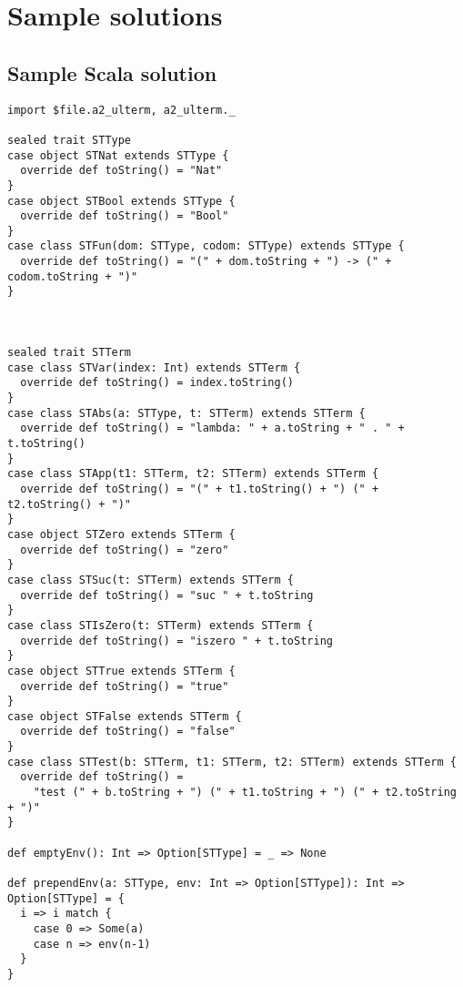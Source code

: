 \documentclass[11pt]{article}
\theoremstyle{definition}
\begin{document}
\section*{Sample solutions}
\label{sec:org2ff2d7b}

\subsection*{Sample Scala solution}
\label{sec:org60900f0}

\begin{verbatim}
import $file.a2_ulterm, a2_ulterm._

sealed trait STType
case object STNat extends STType {
  override def toString() = "Nat"
}
case object STBool extends STType {
  override def toString() = "Bool"
}
case class STFun(dom: STType, codom: STType) extends STType {
  override def toString() = "(" + dom.toString + ") -> (" + codom.toString + ")"
}



sealed trait STTerm
case class STVar(index: Int) extends STTerm {
  override def toString() = index.toString()
}
case class STAbs(a: STType, t: STTerm) extends STTerm {
  override def toString() = "lambda: " + a.toString + " . " + t.toString()
}
case class STApp(t1: STTerm, t2: STTerm) extends STTerm {
  override def toString() = "(" + t1.toString() + ") (" + t2.toString() + ")"
}
case object STZero extends STTerm {
  override def toString() = "zero"
}
case class STSuc(t: STTerm) extends STTerm {
  override def toString() = "suc " + t.toString
}
case class STIsZero(t: STTerm) extends STTerm {
  override def toString() = "iszero " + t.toString
}
case object STTrue extends STTerm {
  override def toString() = "true"
}
case object STFalse extends STTerm {
  override def toString() = "false"
}
case class STTest(b: STTerm, t1: STTerm, t2: STTerm) extends STTerm {
  override def toString() =
    "test (" + b.toString + ") (" + t1.toString + ") (" + t2.toString + ")"
}

def emptyEnv(): Int => Option[STType] = _ => None

def prependEnv(a: STType, env: Int => Option[STType]): Int => Option[STType] = {
  i => i match {
    case 0 => Some(a)
    case n => env(n-1)
  }
}


\end{verbatim}
\end{document}

